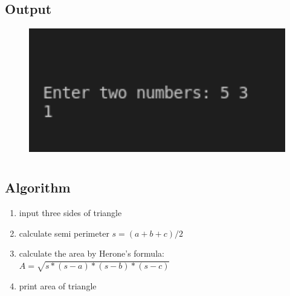 \documentclass[12pt]{article}
\begin{document}
\subsection{Output}
\begin{figure}[h]
    \centering
    \includegraphics[width=1.0\textwidth]{4e.png}
\end{figure}
\newpage
\section{}
\subsection{Algorithm}
\begin{enumerate}
    \item input three sides of triangle
    \item calculate semi perimeter $s=(a+b+c)/2$
    \item calculate the area by Herone's formula: $A = \sqrt{s*(s-a)*(s-b)*(s-c)}$
    \item print area of triangle
\end{enumerate}
\end{document}

